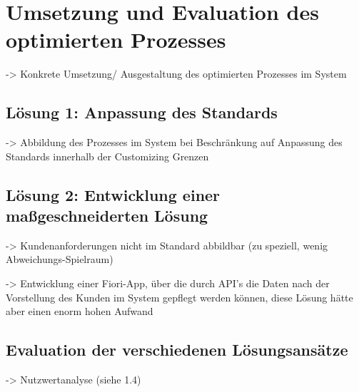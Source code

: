 \chapter{Umsetzung und Evaluation des optimierten Prozesses}

-> Konkrete Umsetzung/ Ausgestaltung des optimierten Prozesses im System 

\section{Lösung 1: Anpassung des Standards}

-> Abbildung des Prozesses im System bei Beschränkung auf Anpassung des Standards innerhalb der Customizing Grenzen

\section{Lösung 2: Entwicklung einer ma\ss geschneiderten Lösung}

-> Kundenanforderungen nicht im Standard abbildbar (zu speziell, wenig Abweichungs-Spielraum)

-> Entwicklung einer Fiori-App, über die durch API's die Daten nach der Vorstellung des Kunden im System gepflegt werden können, diese Lösung hätte aber einen enorm hohen Aufwand

\section{Evaluation der verschiedenen Lösungsansätze}

-> Nutzwertanalyse (siehe 1.4)